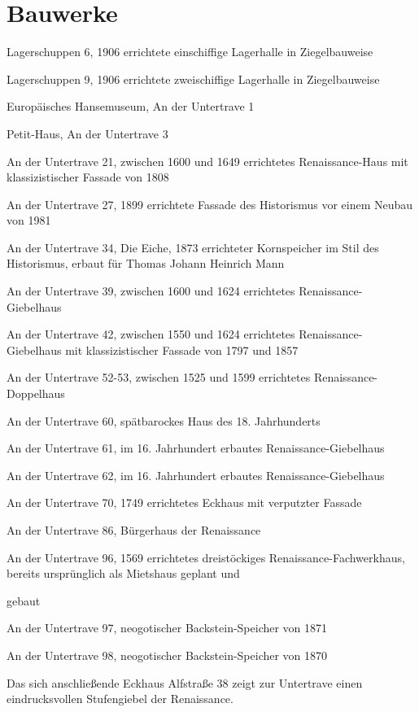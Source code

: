 
\chapter{Bauwerke}
\label{chapter-bauwerke}

\begin{compactitem}
\item Lagerschuppen 6, 1906 errichtete einschiffige Lagerhalle in Ziegelbauweise
\item Lagerschuppen 9, 1906 errichtete zweischiffige Lagerhalle in Ziegelbauweise
\item Europäisches Hansemuseum, An der Untertrave 1
\item Petit-Haus, An der Untertrave 3
\item An der Untertrave 21, zwischen 1600 und 1649 errichtetes Renaissance-Haus mit klassizistischer Fassade von 1808
\item An der Untertrave 27, 1899 errichtete Fassade des Historismus vor einem Neubau von 1981
\item An der Untertrave 34, Die Eiche, 1873 errichteter Kornspeicher im Stil des Historismus, erbaut für Thomas Johann Heinrich Mann
\item An der Untertrave 39, zwischen 1600 und 1624 errichtetes Renaissance-Giebelhaus
\item An der Untertrave 42, zwischen 1550 und 1624 errichtetes Renaissance-Giebelhaus mit klassizistischer Fassade von 1797 und 1857
\item An der Untertrave 52-53, zwischen 1525 und 1599 errichtetes Renaissance-Doppelhaus
\item An der Untertrave 60, spätbarockes Haus des 18. Jahrhunderts
\item An der Untertrave 61, im 16. Jahrhundert erbautes Renaissance-Giebelhaus
\item An der Untertrave 62, im 16. Jahrhundert erbautes Renaissance-Giebelhaus
\item An der Untertrave 70, 1749 errichtetes Eckhaus mit verputzter Fassade
\item An der Untertrave 86, Bürgerhaus der Renaissance
\item An der Untertrave 96, 1569 errichtetes dreistöckiges Renaissance-Fachwerkhaus, bereits ursprünglich als Mietshaus geplant und \item gebaut
\item An der Untertrave 97, neogotischer Backstein-Speicher von 1871
\item An der Untertrave 98, neogotischer Backstein-Speicher von 1870
\item Das sich anschließende Eckhaus Alfstraße 38 zeigt zur Untertrave einen eindrucksvollen Stufengiebel der Renaissance.
\end{compactitem}
